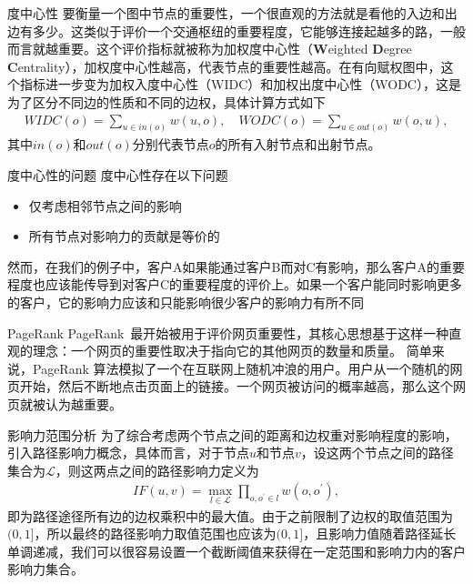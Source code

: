 \documentclass[aspectratio=169]{beamer}
\begin{document}
\begin{frame}{度中心性}
    要衡量一个图中节点的重要性，一个很直观的方法就是看他的入边和出边有多少。这类似于评价一个交通枢纽的重要程度，它能够连接起越多的路，一般而言就越重要。这个评价指标就被称为加权度中心性（\textbf{W}eighted \textbf{D}egree \textbf{C}entrality），加权度中心性越高，代表节点的重要性越高。在有向赋权图中，这个指标进一步变为加权入度中心性（WIDC）和加权出度中心性（WODC），这是为了区分不同边的性质和不同的边权，具体计算方式如下
\begin{align*}
    WIDC(o) = \sum_{u \in in(o)} w(u, o),\quad WODC(o) = \sum_{u\in out(o)} w(o, u),
\end{align*}
其中$in(o)$和$out(o)$分别代表节点$o$的所有入射节点和出射节点。

\end{frame}

\begin{frame}{度中心性的问题}
    度中心性存在以下问题
    \begin{itemize}
        \item 仅考虑相邻节点之间的影响
        \item 所有节点对影响力的贡献是等价的
    \end{itemize}
    然而，在我们的例子中，客户A如果能通过客户B而对C有影响，那么客户A的重要程度也应该能传导到对客户C的重要程度的评价上。如果一个客户能同时影响更多的客户，它的影响力应该和只能影响很少客户的影响力有所不同
\end{frame}

\begin{frame}{PageRank}
    PageRank~\citep{Page1999ThePC}最开始被用于评价网页重要性，其核心思想基于这样一种直观的理念：一个网页的重要性取决于指向它的其他网页的数量和质量。
    简单来说，PageRank 算法模拟了一个在互联网上随机冲浪的用户。用户从一个随机的网页开始，然后不断地点击页面上的链接。一个网页被访问的概率越高，那么这个网页就被认为越重要。
\end{frame}

\begin{frame}{影响力范围分析}
    为了综合考虑两个节点之间的距离和边权重对影响程度的影响，引入路径影响力概念，具体而言，对于节点$u$和节点$v$，设这两个节点之间的路径集合为$\mathcal{L}$，则这两点之间的路径影响力定义为
\begin{align*}
    IF(u, v) = \max_{l\in \mathcal{L}} \prod_{o, o^\prime \in l} w(o, o^\prime),
\end{align*}
即为路径途径所有边的边权乘积中的最大值。由于之前限制了边权的取值范围为$(0, 1]$，所以最终的路径影响力取值范围也应该为$(0, 1]$，且影响力值随着路径延长单调递减，我们可以很容易设置一个截断阈值来获得在一定范围和影响力内的客户影响力集合。
\end{frame}
\end{document}
